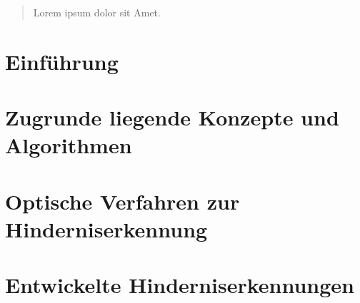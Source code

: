 \documentclass[pdftex,12pt,a4paper]{report}
\begin{document}

\deckblatt


\erklaerung


\begin{abstract}

Lorem ipsum dolor sit Amet.

\end{abstract}



\tableofcontents


\chapter{Einführung}
\label{chp:introduction}



\chapter{Zugrunde liegende Konzepte und Algorithmen}
\label{chp:concepts}



\chapter{Optische Verfahren zur Hinderniserkennung}
\label{chp:stateoftheart}



\chapter{Entwickelte Hinderniserkennungen}
\label{chp:developed_algorithms}

\end{document}

